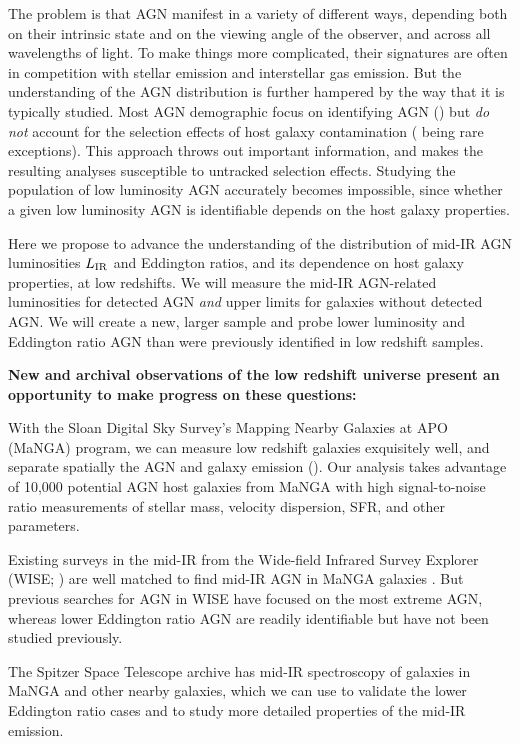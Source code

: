 \documentclass[12pt, preprint]{hacked-aastex}
\newlength{\mylen}
\newenvironment{ditemize}
{ \begin{list}{}{%
\setlength{\topsep}{0pt}%
\setlength{\partopsep}{3pt}%
\setlength{\itemsep}{1pt}\setlength{\parsep}{1pt}%
\setlength{\itemindent}{0pt}\setlength{\listparindent}{12pt}%
\setlength{\leftmargin}{24pt}\setlength{\rightmargin}{0in}%
\setlength{\labelsep}{3pt}\setlength{\labelwidth}{6pt}%
\setlength{\mylen}{3pt}
\renewcommand{\makelabel}{\makebox[\labelwidth][l]{\raisebox{\mylen}{\tiny$\bullet$}\hspace{\fill}}}}}
{\end{list}}
\begin{document}
The problem is that AGN manifest in a variety of different ways,
depending both on their intrinsic state and on the viewing angle of
the observer, and across all wavelengths of light.  To make things
more complicated, their signatures are often in competition with
stellar emission and interstellar gas emission.  But the understanding
of the AGN distribution is further hampered by the way that it is
typically studied. Most AGN demographic focus on identifying AGN
(\cite{kauffmann03b, lacy15a, sanchez18a, comerford20a, greene20a})
but {\it do not} account for the selection effects of host galaxy
contamination (\cite{trump15a, jones17a} being rare exceptions). This
approach throws out important information, and makes the resulting
analyses susceptible to untracked selection effects.  Studying the
population of low luminosity AGN accurately becomes impossible, since
whether a given low luminosity AGN is identifiable depends on the host
galaxy properties.

Here we propose to advance the understanding of the distribution of
mid-IR AGN luminosities $L_{\rm IR}$ and Eddington ratios, and its
dependence on host galaxy properties, at low redshifts.  We will
measure the mid-IR AGN-related luminosities for detected AGN {\it and}
upper limits for galaxies without detected AGN. We will create a new,
larger sample and probe lower luminosity and Eddington ratio AGN than
were previously identified in low redshift samples.

{\bf New and archival observations of the low redshift universe
  present an opportunity to make progress on these
  questions:}
\begin{ditemize}
\item With the Sloan Digital Sky Survey's Mapping Nearby Galaxies at
  APO (MaNGA) program, we can measure low redshift galaxies
  exquisitely well, and separate spatially the AGN and galaxy emission
  (\cite{bundy15a, blanton17a}).  Our analysis takes advantage of
  10,000 potential AGN host galaxies from MaNGA with high
  signal-to-noise ratio measurements of stellar mass, velocity
  dispersion, SFR, and other parameters.
\item Existing surveys in the mid-IR from the Wide-field Infrared
  Survey Explorer (WISE; \cite{wright10a}) are well matched to find
  mid-IR AGN in MaNGA galaxies \cite{comerford20a}. But previous
  searches for AGN in WISE have focused on the most extreme AGN,
  whereas lower Eddington ratio AGN are readily identifiable but have
  not been studied previously.
\item The Spitzer Space Telescope archive has mid-IR spectroscopy of
  galaxies in MaNGA and other nearby galaxies, which we can use to
  validate the lower Eddington ratio cases and to study more detailed
  properties of the mid-IR emission.
\end{ditemize}
\end{document}

